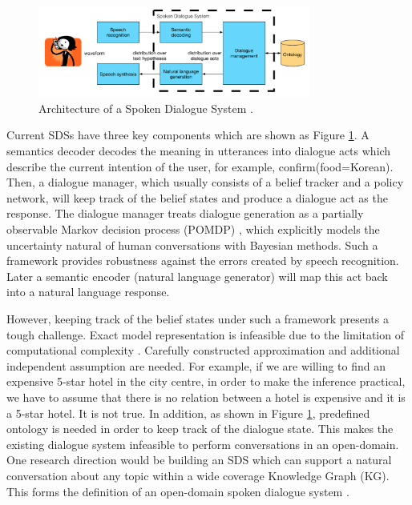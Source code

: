 \documentclass[bsc,frontabs,twoside,singlespacing,parskip,deptreport]{infthesis}     %
\begin{document}
\begin{figure}[h]
    \centering
    \includegraphics[width=0.80\textwidth]{sds.png}
    \caption{Architecture of a Spoken Dialogue System \cite{gasic}.}
    \label{fig:sds}
\end{figure}

Current SDSs have three key components which are shown as Figure \ref{fig:sds}. A semantics decoder decodes the meaning in utterances into dialogue acts which describe the current intention of the user, for example, confirm(food=Korean). Then, a dialogue manager, which usually consists of a belief tracker and a policy network, will keep track of the belief states and produce a dialogue act as the response. The dialogue manager treats dialogue generation as a partially observable Markov decision process (POMDP) \cite{williams2007partially,young2013pomdp,young2010hidden}, which explicitly models the uncertainty natural of human conversations with Bayesian methods. Such a framework provides robustness against the errors created by speech recognition. Later a semantic encoder (natural language generator) will map this act back into a natural language response.

However, keeping track of the belief states under such a framework presents a tough challenge. Exact model representation is infeasible due to the limitation of computational complexity \cite{young2013pomdp}. Carefully constructed approximation and additional independent assumption are needed. For example, if we are willing to find an expensive 5-star hotel in the city centre, in order to make the inference practical, we have to assume that there is no relation between a hotel is expensive and it is a 5-star hotel. It is not true. In addition, as shown in Figure \ref{fig:sds}, predefined ontology is needed in order to keep track of the dialogue state. This makes the existing dialogue system infeasible to perform conversations in an open-domain. One research direction would be building an SDS which can support a natural conversation about any topic within a wide coverage Knowledge Graph (KG). This forms the definition of an open-domain spoken dialogue system \cite{opendomain}.
\end{document}
